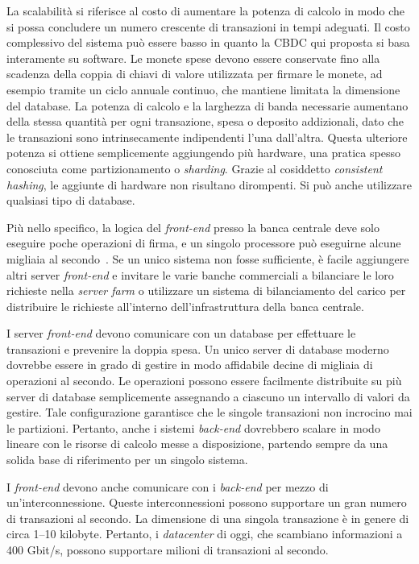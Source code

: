 \documentclass{article}
\begin{document}
La scalabilità si riferisce al costo di aumentare la potenza di 
calcolo in modo che si possa concludere un numero crescente di 
transazioni in tempi adeguati. Il costo complessivo del sistema può 
essere basso in quanto la CBDC qui proposta si basa interamente su 
software. Le monete spese devono essere conservate fino alla scadenza 
della coppia di chiavi di valore utilizzata per firmare le monete, ad 
esempio tramite un ciclo annuale continuo, che mantiene limitata la 
dimensione del database. La potenza di calcolo e la larghezza di banda 
necessarie aumentano della stessa quantità per ogni transazione, spesa 
o deposito addizionali, dato che le transazioni sono intrinsecamente 
indipendenti l'una dall'altra. Questa ulteriore potenza si ottiene 
semplicemente aggiungendo più hardware, una pratica spesso conosciuta 
come partizionamento o \textit{sharding}. Grazie al cosiddetto 
\textit{consistent hashing}, le aggiunte di hardware non risultano 
dirompenti. Si può anche utilizzare qualsiasi tipo di database.

Più nello specifico, la logica del \textit{front-end} presso la banca 
centrale deve solo eseguire poche operazioni di firma, e un singolo 
processore può eseguirne alcune migliaia al secondo~\cite[vedi][]{Bernstein2020}. 
Se un unico sistema non fosse sufficiente, è facile aggiungere altri 
server \textit{front-end} e invitare le varie banche commerciali a 
bilanciare le loro richieste nella \textit{server farm} o 
utilizzare un sistema di bilanciamento del carico per distribuire le 
richieste all'interno dell'infrastruttura della banca centrale.

I server \textit{front-end} devono comunicare con un database per 
effettuare le transazioni e prevenire la doppia spesa. Un unico server 
di database moderno dovrebbe essere in grado di gestire in modo 
affidabile decine di migliaia di operazioni al secondo. Le operazioni 
possono essere facilmente distribuite su più server di database 
semplicemente assegnando a ciascuno un intervallo di valori da 
gestire. Tale configurazione garantisce che le singole transazioni non 
incrocino mai le partizioni. Pertanto, anche i sistemi \textit{back-end} 
dovrebbero scalare in modo lineare con le risorse di calcolo messe a 
disposizione, partendo sempre da una solida base di riferimento per un 
singolo sistema.

I \textit{front-end} devono anche comunicare con i \textit{back-end} per 
mezzo di un'interconnessione. Queste interconnessioni possono 
supportare un gran numero di transazioni al secondo. La dimensione di 
una singola transazione è in genere di circa 1–10 kilobyte. Pertanto, 
i \textit{datacenter} di oggi, che scambiano informazioni a 400 Gbit/s, 
possono supportare milioni di transazioni al secondo.
\end{document}
